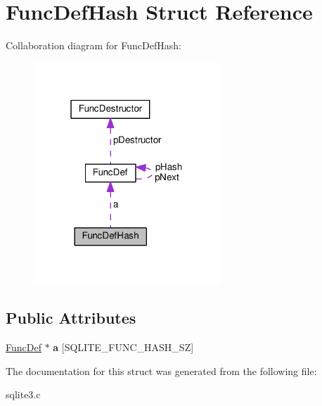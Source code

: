 \hypertarget{structFuncDefHash}{}\section{Func\+Def\+Hash Struct Reference}
\label{structFuncDefHash}


Collaboration diagram for Func\+Def\+Hash\+:\nopagebreak
\begin{figure}[H]
\begin{center}
\leavevmode
\includegraphics[width=199pt]{structFuncDefHash__coll__graph}
\end{center}
\end{figure}
\subsection*{Public Attributes}
\begin{DoxyCompactItemize}
\item 
\hyperlink{structFuncDef}{Func\+Def} $\ast$ {\bfseries a} \mbox{[}S\+Q\+L\+I\+T\+E\+\_\+\+F\+U\+N\+C\+\_\+\+H\+A\+S\+H\+\_\+\+SZ\mbox{]}\hypertarget{structFuncDefHash_aaab2cd9c5f40d92c236f8fdeb2d9849a}{}\label{structFuncDefHash_aaab2cd9c5f40d92c236f8fdeb2d9849a}

\end{DoxyCompactItemize}


The documentation for this struct was generated from the following file\+:\begin{DoxyCompactItemize}
\item 
sqlite3.\+c\end{DoxyCompactItemize}
